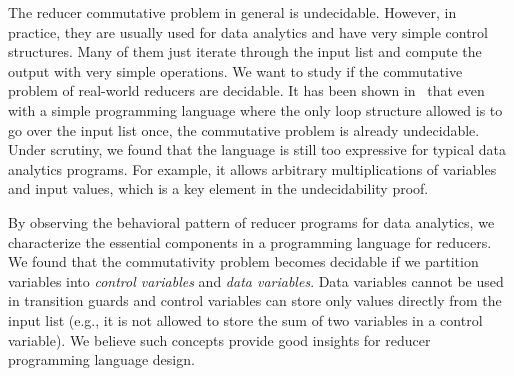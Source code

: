 The reducer commutative problem in general is undecidable. However, in practice, they are usually used for data analytics and have very simple control structures. Many of them just iterate through the input list and compute the output with very simple operations. We want to study if the commutative problem of real-world reducers are decidable. It has been shown in~\cite{CHSW15} that even with a simple programming language where  the only loop structure allowed is to go over the input list once, the commutative problem is already undecidable. Under scrutiny, we found that the language is still too expressive for typical data analytics programs. For example, it allows arbitrary multiplications of variables and input values, which is a key element in the undecidability proof.

By observing the behavioral pattern of reducer programs for data analytics, we characterize the essential components in a programming language for reducers. %
We found that the commutativity problem becomes decidable if we partition variables into \emph{control variables} and \emph{data variables}. Data variables cannot be used in transition guards and control variables can store only values directly from the input list (e.g., it is not allowed to store the sum of two variables in a control variable). 
We believe such concepts provide good insights for reducer programming language design.

